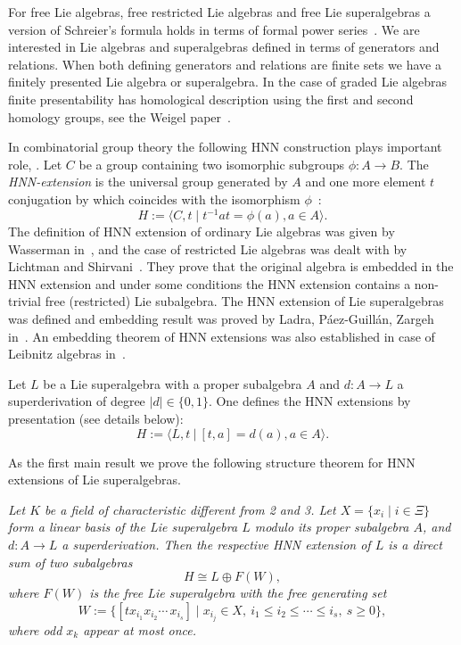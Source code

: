 \documentclass[12pt, reqno]{amsart}
\theoremstyle{remark}
\theoremstyle{definition}
\numberwithin{equation}{section}
\begin{document}
For free Lie algebras, free restricted Lie algebras and free Lie superalgebras a version of Schreier's formula holds in terms of formal power series~\cite{Pe00sch}. 
We are interested  in Lie algebras and superalgebras defined in terms of generators and relations. 
When both defining generators and relations are finite sets we have a finitely presented Lie algebra or superalgebra. 
In the case of graded Lie algebras finite presentability has homological description using the  first and second homology groups, see the Weigel paper~\cite{Thomas}. 

In combinatorial group theory the following HNN construction plays important role, \cite{LyndonShupp}.
 Let $C$ be a group containing two  isomorphic subgroups $\phi: A\to B$. 
The {\it HNN-extension} is the universal group generated by $A$ and one more 
element $t$ conjugation by which coincides with the isomorphism $\phi$~\cite{HNN,LyndonShupp}:
$$ H:=\langle C,t \mid t^{-1} a t=\phi(a), a\in A\rangle. $$   
The definition of HNN extension of ordinary Lie algebras was  given by Wasserman in~\cite{W}, 
and the case of restricted Lie algebras was dealt with by Lichtman and Shirvani~\cite{L-S}.
They prove that the original algebra is embedded in the HNN extension and  under some conditions the HNN extension contains a non-trivial free (restricted) Lie subalgebra.
The HNN extension of Lie superalgebras was defined  and embedding result was proved 
by Ladra, Páez-Guillán, Zargeh in~\cite{L-P-Z}.
An embedding theorem of HNN extensions was also established in case of Leibnitz algebras in~\cite{LSZ}.
\medskip


Let $L$ be a Lie superalgebra with a proper subalgebra $A$ and $d:A\to L$ a  superderivation of degree $|d| \in \{0, 1 \}$.
One defines the HNN extensions by presentation (see details below):
\begin{equation*} %
H  :=  \langle L, t \ | \ [t,a] = d(a), a \in A \rangle. 
\end{equation*}  
 
\medskip

As the first main result we prove the following structure theorem for HNN extensions of Lie superalgebras. 
\medskip 
 
  {\it Let $K$ be a field of characteristic different from 2 and 3.
Let $X=\{x_i\mid i\in\Xi\}$ form a linear basis of the Lie superalgebra $L$ modulo its proper subalgebra $A$, and $d:A\to L$ a superderivation.
Then the respective HNN extension of $L$ is a direct sum of two subalgebras
$$ H\cong L\oplus F(W), $$
where $F(W)$ is the free Lie superalgebra with the free generating set
\begin{equation*}%
 W:=\{ [t x_{i_1}x_{i_2}\cdots\, x_{i_s}] \mid x_{i_j}\in X,\ i_1\le i_2\le \cdots\le  i_s,\ s \ge 0  \},
\end{equation*}
where odd $x_k$ appear at most once.}
\end{document}
